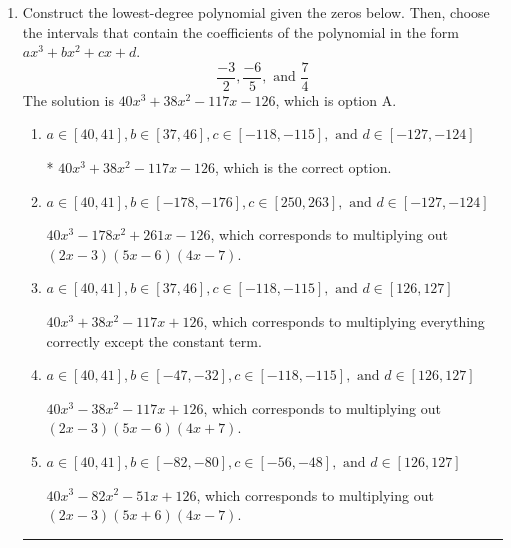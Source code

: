 \documentclass{extbook}[14pt]
\newcommand{\litem}[1]{\item #1

\rule{\textwidth}{0.4pt}}
\begin{document}
\begin{enumerate}\litem{
Construct the lowest-degree polynomial given the zeros below. Then, choose the intervals that contain the coefficients of the polynomial in the form $ax^3+bx^2+cx+d$.
\[ \frac{-3}{2}, \frac{-6}{5}, \text{ and } \frac{7}{4} \]The solution is \( 40x^{3} +38 x^{2} -117 x -126 \), which is option A.\begin{enumerate}[label=\Alph*.]
\item \( a \in [40, 41], b \in [37, 46], c \in [-118, -115], \text{ and } d \in [-127, -124] \)

* $40x^{3} +38 x^{2} -117 x -126$, which is the correct option.
\item \( a \in [40, 41], b \in [-178, -176], c \in [250, 263], \text{ and } d \in [-127, -124] \)

$40x^{3} -178 x^{2} +261 x -126$, which corresponds to multiplying out $(2x -3)(5x -6)(4x -7)$.
\item \( a \in [40, 41], b \in [37, 46], c \in [-118, -115], \text{ and } d \in [126, 127] \)

$40x^{3} +38 x^{2} -117 x + 126$, which corresponds to multiplying everything correctly except the constant term.
\item \( a \in [40, 41], b \in [-47, -32], c \in [-118, -115], \text{ and } d \in [126, 127] \)

$40x^{3} -38 x^{2} -117 x + 126$, which corresponds to multiplying out $(2x -3)(5x -6)(4x + 7)$.
\item \( a \in [40, 41], b \in [-82, -80], c \in [-56, -48], \text{ and } d \in [126, 127] \)

$40x^{3} -82 x^{2} -51 x + 126$, which corresponds to multiplying out $(2x -3)(5x + 6)(4x -7)$.
\end{enumerate}

}
\end{enumerate}
\end{document}
